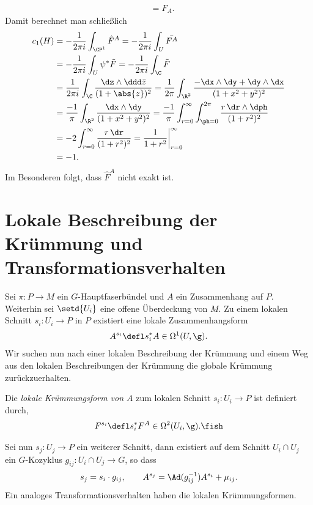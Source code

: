 \documentclass[%
	paper=a5,%
	fleqn,%
	DIV=18,%
	BCOR=0mm,
	fontsize=11pt,
	titlepage=false,%
	bibliography=totoc,
	DIV=18,%
	twoside=true,
	pdftitle=Riemannsche Geometrie,
	pdfauthor=Uwe Semmelmann,
	numbers=noendperiod]%
	{scrbook}
\begin{document}
\begin{ex}
\begin{align*}
&= F_A.
\end{align*}
Damit berechnet man schließlich
\begin{align*}
c_1(H) &= -\frac{1}{2\pi i} \int_{\CP^1} \hat{F}^A
 = -\frac{1}{2\pi i} \int_{U} \bar{F^A}\\
  &= -\frac{1}{2\pi i} \int_{U} \psi^* \tilde{F}
  = -\frac{1}{2\pi i} \int_{\C} \tilde{F}\\
  &= \frac{1}{2\pi i} \int_{\C} \frac{\dz\wedge \ddd\bar{z}}{(1+\abs{z})^2}
  = \frac{1}{2\pi} \int_{\R^2} \frac{-\dx\wedge \dy + \dy\wedge \dx 
  }{(1+x^2+y^2)^2}\\
  &= \frac{-1}{\pi} \int_{\R^2} \frac{\dx\wedge \dy  
  }{(1+x^2+y^2)^2} = 
  \frac{-1}{\pi} \int_{r=0}^\infty \int_{\ph=0}^{2\pi} \frac{r\,\dr\wedge\dph  
  }{(1+r^2)^2}\\
  &= -2 \int_{r=0}^\infty \frac{r\,\dr  
  }{(1+r^2)^2} =
  \frac{1}{1+r^2} \bigg|_{r=0}^\infty \\ 
  &= - 1.
\end{align*} 
Im Besonderen folgt, dass $\hat{F}^A$ nicht exakt ist.\boxc
\end{ex}


\section{Lokale Beschreibung der Krümmung und Transformationsverhalten}

Sei $\pi\colon P\to M$ ein $G$-Hauptfaserbündel und $A$ ein Zusammenhang auf $P$.
Weiterhin sei $\setd{U_i}$ eine offene Überdeckung von $M$. Zu einem lokalen
Schnitt $s_i \colon U_i\to P$ in $P$ existiert eine lokale Zusammenhangsform
\begin{align*}
A^{s_i} \defl s_i^* A \in\Omega^1(U,\g).
\end{align*}
Wir suchen nun nach einer lokalen Beschreibung der Krümmung und einem Weg aus
den lokalen Beschreibungen der Krümmung die globale Krümmung zurückzuerhalten.

\begin{defn}
Die \emph{lokale Krümmungsform von $A$} zum lokalen Schnitt $s_i \colon U_i\to P$ ist
definiert durch,
\begin{align*}
F^{s_i} \defl s_i^* F^A \in \Omega^2(U_i,\g).\fish
\end{align*}
\end{defn}

Sei nun $s_j \colon U_j\to P$ ein weiterer Schnitt, dann existiert auf dem Schnitt $U_i\cap U_j$ ein $G$-Kozyklus
$g_{ij}\colon U_i\cap U_j\to G$, so dass
\begin{align*}
s_j = s_i\cdot g_{ij},\qquad A^{s_j} = \Ad(g_{ij}^{-1})A^{s_i} + \mu_{ij}.
\end{align*}
Ein analoges Transformationsverhalten haben die lokalen Krümmungsformen.
\end{document}
